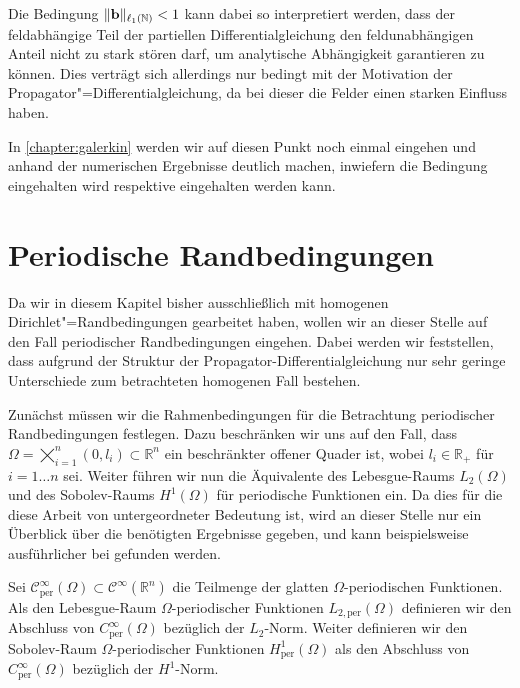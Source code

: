 \documentclass[../main.tex]{subfiles}
\begin{document}
Die Bedingung $\lVert\mathbf{b}\rVert_{\ell_{1}(\mathbb{N})} < 1$ kann dabei so interpretiert werden, dass der feldabhängige Teil der partiellen Differentialgleichung den feldunabhängigen Anteil nicht zu stark stören darf, um analytische Abhängigkeit garantieren zu können.
Dies verträgt sich allerdings nur bedingt mit der Motivation der Propagator"=Differentialgleichung, da bei dieser die Felder einen starken Einfluss haben.

In \cref{chapter:galerkin} werden wir auf diesen Punkt noch einmal eingehen und anhand der numerischen Ergebnisse deutlich machen, inwiefern die Bedingung eingehalten wird respektive eingehalten werden kann.

\section{Periodische Randbedingungen} %
\label{section:periodische_randbedingungen}

Da wir in diesem Kapitel bisher ausschließlich mit homogenen Dirichlet"=Randbedingungen gearbeitet haben, wollen wir an dieser Stelle auf den Fall periodischer Randbedingungen eingehen.
Dabei werden wir feststellen, dass aufgrund der Struktur der Propagator-Differentialgleichung nur sehr geringe Unterschiede zum betrachteten homogenen Fall bestehen.

Zunächst müssen wir die Rahmenbedingungen für die Betrachtung periodischer Randbedingungen festlegen.
Dazu beschränken wir uns auf den Fall, dass $\Omega = \bigtimes_{i = 1}^{n} (0, l_{i}) \subset \mathbb{R}^{n}$ ein beschränkter offener Quader ist, wobei $l_{i} \in \mathbb{R}_{+}$ für $i = 1 \dots n$ sei.
Weiter führen wir nun die Äquivalente des Lebesgue-Raums $L_{2}(\Omega)$ und des Sobolev-Raums $H^{1}(\Omega)$ für periodische Funktionen ein.
Da dies für die diese Arbeit von untergeordneter Bedeutung ist, wird an dieser Stelle nur ein Überblick über die benötigten Ergebnisse gegeben, und kann beispielsweise ausführlicher bei \textcite{Han2009} gefunden werden.

\begin{Definition}
\label{definition:periodische_sobolev_raeume}
    Sei $\mathcal C_{\text{per}}^{\infty}(\Omega) \subset \mathcal C^{\infty}(\mathbb{R}^{n})$ die Teilmenge der glatten $\Omega$-periodischen Funktionen.
    Als den Lebesgue-Raum $\Omega$-periodischer Funktionen $L_{2,\text{per}}(\Omega)$  definieren wir den Abschluss von $C_{\text{per}}^{\infty}(\Omega)$ bezüglich der $L_{2}$-Norm.
    Weiter definieren wir den Sobolev-Raum $\Omega$-periodischer Funktionen $H^{1}_{\text{per}}(\Omega)$ als den Abschluss von $C_{\text{per}}^{\infty}(\Omega)$ bezüglich der $H^{1}$-Norm.
\end{Definition}
\end{document}
